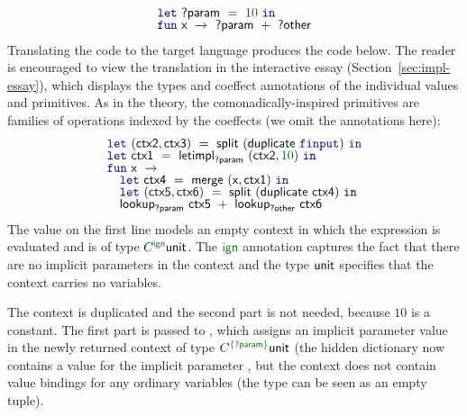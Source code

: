 \begin{equation*}
\begin{array}{l}
\kvd{let}~\ident{?param} ~=~ \num{10}~\kvd{in}\\[-0.25em]
\kvd{fun}~\ident{x}~\rightarrow~\ident{?param} ~+~ \ident{?other}
\end{array}
\end{equation*}
%
Translating the code to the target language produces the code below. The reader is encouraged to
view the translation in the interactive essay (Section~\ref{sec:impl-essay}), which displays the
types and coeffect annotations of the individual values and primitives. As in the theory, the
comonadically-inspired primitives are families of operations indexed by the coeffects (we
omit the annotations here):
%
\begin{equation*}
\begin{array}{l}
\kvd{let}~(\ident{ctx2}, \ident{ctx3}) ~=~ \ident{split}~(\ident{duplicate}~\kvd{finput})~\kvd{in}\\[-0.25em]
\kvd{let}~\ident{ctx1} ~=~ \ident{letimpl}_{\ident{?param}}~(\ident{ctx2}, \num{10})~\kvd{in}\\[-0.25em]
\kvd{fun}~\ident{x}~\rightarrow\\[-0.25em]
\quad \kvd{let}~\ident{ctx4} ~=~ \ident{merge}~(\ident{x}, \ident{ctx1})~\kvd{in}\\[-0.25em]
\quad \kvd{let}~(\ident{ctx5}, \ident{ctx6}) ~=~ \ident{split}~(\ident{duplicate}~\ident{ctx4})~\kvd{in}\\[-0.25em]
\quad \ident{lookup}_{\ident{?param}}~\ident{ctx5} ~+~ \ident{lookup}_{\ident{?other}}~\ident{ctx6}
\end{array}
\end{equation*}
%
The  value on the first line models an empty context in which the expression is
evaluated and is of type $\ctyp{\czero}{\ident{unit}}$. The $\czero$ annotation captures the
fact that there are no implicit parameters in the context and the type $\textnormal{\sffamily unit}$ specifies
that the context carries no variables.

The context is duplicated and the second part  is not needed, because $\num{10}$ is a
constant. The first part  is passed to , which assigns an implicit
parameter value in the newly returned context  of type
$\ctyp{\cclrd{\{\ident{?param}\}}}{\ident{unit}}$ (the hidden dictionary now contains a value
for the implicit parameter , but the context does not contain value bindings for
any ordinary variables (the  type can be seen as an empty tuple).

